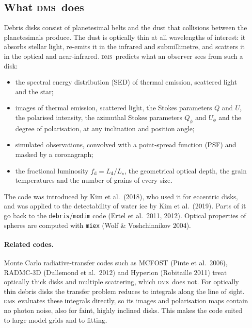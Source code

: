 \documentclass[11pt,a4paper]{article}
\newcommand{\dms}{\textsc{dms}}
\newcommand{\code}[1]{\texttt{#1}}
\begin{document}
\subsection{What \dms\ does}

Debris disks consist of planetesimal belts and the dust that collisions between the planetesimals
produce. The dust is optically thin at all wavelengths of interest: it absorbs stellar light,
re-emits it in the infrared and submillimetre, and scatters it in the optical and near-infrared.
\dms\ predicts what an observer sees from such a disk:
\begin{itemize}
\item the spectral energy distribution (SED) of thermal emission, scattered light and the star;
\item images of thermal emission, scattered light, the Stokes parameters $Q$ and $U$, the
      polarised intensity, the azimuthal Stokes parameters $Q_\phi$ and $U_\phi$ and the degree
      of polarisation, at any inclination and position angle;
\item simulated observations, convolved with a point-spread function (PSF) and masked by a
      coronagraph;
\item the fractional luminosity $f_\mathrm{d}=L_\mathrm{d}/L_\star$, the geometrical optical
      depth, the grain temperatures and the number of grains of every size.
\end{itemize}

The code was introduced by Kim et al.\ (2018), who used it for eccentric disks, and was applied
to the detectability of water ice by Kim et al.\ (2019). Parts of it go back to the
\code{debris}/\code{modim} code (Ertel et al.\ 2011, 2012). Optical properties of spheres are
computed with \code{miex} (Wolf \& Voshchinnikov 2004).

\paragraph{Related codes.} Monte Carlo radiative-transfer codes such as MCFOST (Pinte et al.\
2006), RADMC-3D (Dullemond et al.\ 2012) and Hyperion (Robitaille 2011) treat optically thick
disks and multiple scattering, which \dms\ does not. For optically thin debris disks the
transfer problem reduces to integrals along the line of sight. \dms\ evaluates these integrals
directly, so its images and polarisation maps contain no photon noise, also for faint, highly
inclined disks. This makes the code suited to large model grids and to fitting.
\end{document}
